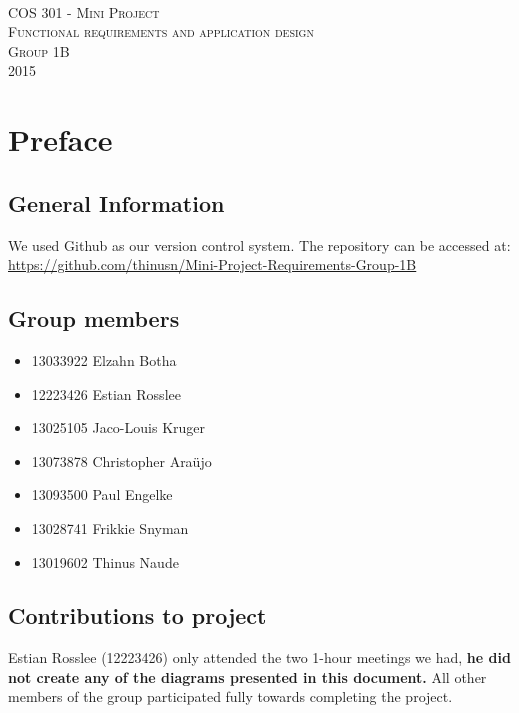 \documentclass [a4paper,12pt] {article}
\begin{document}
\begin{titlepage}
	\begin{center}
		\textsc{\huge\\[5cm] COS 301 - Mini Project}\\[1cm]
		\textsc{\huge Functional requirements and application design}\\[1cm]
		\textsc{\huge Group 1B}\\[1cm]
		\textsc{\large 2015}
	\end{center}
\end{titlepage}
\tableofcontents
\pagebreak
\section{Preface}
	\subsection{General Information}
	We used Github as our version control system. The repository can be accessed at: \linebreak \url{https://github.com/thinusn/Mini-Project-Requirements-Group-1B}
	\subsection{Group members}
	\begin{itemize}
		\item 13033922 Elzahn Botha
		\item 12223426 Estian Rosslee
		\item 13025105 Jaco-Louis Kruger
		\item 13073878 Christopher Araüjo
		\item 13093500 Paul Engelke
		\item 13028741 Frikkie Snyman
		\item 13019602 Thinus Naude
	\end{itemize}
	\subsection{Contributions to project} 
	Estian Rosslee (12223426) only attended the two 1-hour meetings we had, \textbf{he did not create any of the diagrams presented in this document.} All other members of the group participated fully towards completing the project.
\end{document}
